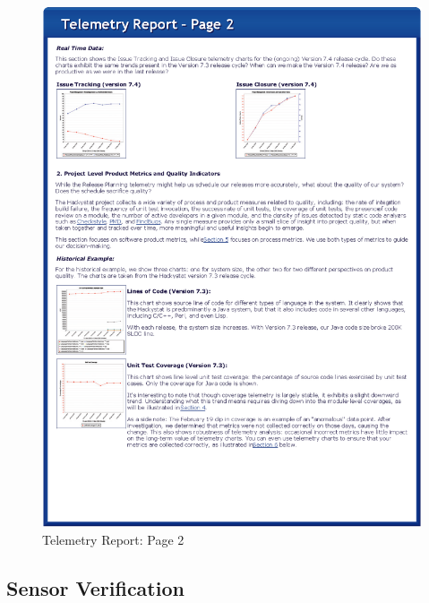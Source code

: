 \begin{figure}[p]
  \center
  \includegraphics[height=0.93\textheight]{figures/TelemetryReport-Page2}
  \caption{Telemetry Report: Page 2} 
  \label{figures/TelemetryReport-Page2}
\end{figure}








\clearpage
\subsection{Sensor Verification}
\label{EvaluationInCSDL:EventsDescription:DataVerification}

